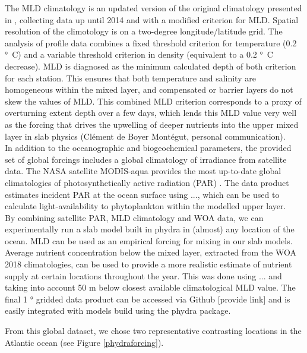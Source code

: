 \documentclass[journal abbreviation, manuscript]{copernicus}
\begin{document}
The MLD climatology is an updated version of the original climatology presented in  \citet{deBoyerMontegut2004MixedClimatology}, collecting data up until 2014 and with a modified criterion for MLD. Spatial resolution of the climotology is on a two-degree longitude/latitude grid. The analysis of profile data combines a fixed threshold criterion for temperature (0.2 \unit{°C}) and a variable threshold criterion in density (equivalent to a 0.2 \unit{°C} decrease). MLD is diagnosed as the minimum calculated depth of both criterion for each station. This ensures that both temperature and salinity are homogeneous within the mixed layer, and compensated or barrier layers do not skew the values of MLD. This combined MLD criterion corresponds to a proxy of overturning extent depth over a few days, which lends this MLD value very well as the forcing that drives the upwelling of deeper nutrients into the upper mixed layer in slab physics (Clément de Boyer Montégut, personal communication).\\

In addition to the oceanographic and biogeochemical parameters, the provided set of global forcings includes a global climatology of irradiance from satellite data. The NASA satellite MODIS-aqua provides the most up-to-date global climatologies of photosynthetically active radiation (PAR) \cite{MODIS-Aqua2018NASAGroup}. The data product estimates incident PAR at the ocean surface using ..., which can be used to calculate light-availability to phytoplankton within the modelled upper layer.\\

By combining satellite PAR, MLD climatology and WOA data, we can experimentally run a slab model built in phydra in (almost) any location of the ocean. MLD can be used as an empirical forcing for mixing in our slab models. Average nutrient concentration below the mixed layer, extracted from the WOA 2018 climatologies, can be used to provide a more realistic estimate of nutrient supply at certain locations throughout the year. This was done using ... and taking into account 50 \unit{m} below closest available climatological MLD value. The final 1 \unit{°} gridded data product can be accessed via Github [provide link] and is easily integrated with models build using the phydra package. 

From this global dataset, we chose two representative contrasting locations in the Atlantic ocean (see Figure \ref{phydraforcing}). \\
\end{document}

